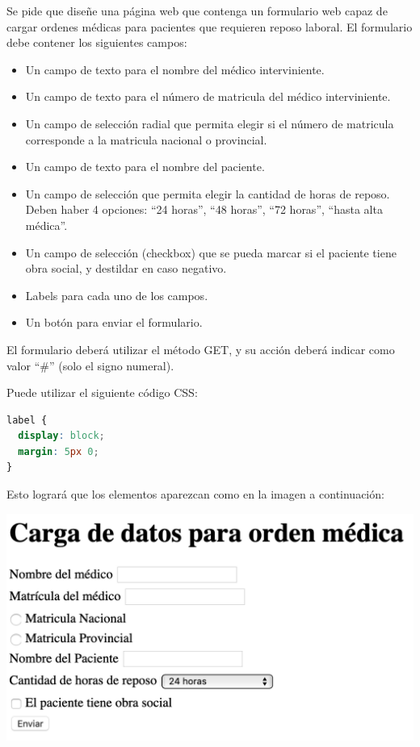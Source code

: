 \begin{exercise}
Se pide que diseñe una página web que contenga un formulario web capaz de
cargar ordenes médicas para pacientes que requieren reposo laboral. El 
formulario debe contener los siguientes campos:
\begin{itemize}
  \item Un campo de texto para el nombre del médico interviniente.
  \item Un campo de texto para el número de matricula del médico interviniente.
  \item Un campo de selección radial que permita elegir si el número de
    matricula corresponde a la matricula nacional o provincial.
  \item Un campo de texto para el nombre del paciente.
  \item Un campo de selección que permita elegir la cantidad de horas de reposo.
    Deben haber 4 opciones: ``24 horas'', ``48 horas'', ``72 horas'', ``hasta alta médica''.
  \item Un campo de selección (checkbox) que se pueda marcar si el paciente
    tiene obra social, y destildar en caso negativo.
  \item Labels para cada uno de los campos.
  \item Un botón para enviar el formulario.
\end{itemize}
El formulario deberá utilizar el método GET, y su acción deberá indicar como
valor ``\#'' (solo el signo numeral).

Puede utilizar el siguiente código CSS:
\begin{adjustwidth}{25pt}{10pt}
  \begin{lstlisting}[language=CSS]
label {
  display: block;
  margin: 5px 0;
}
  \end{lstlisting}
\end{adjustwidth}
Esto logrará que los elementos aparezcan como en la imagen a continuación:

\includegraphics[scale=0.65]{apendices/html/imagenes/formulario_1.png}
\end{exercise}

